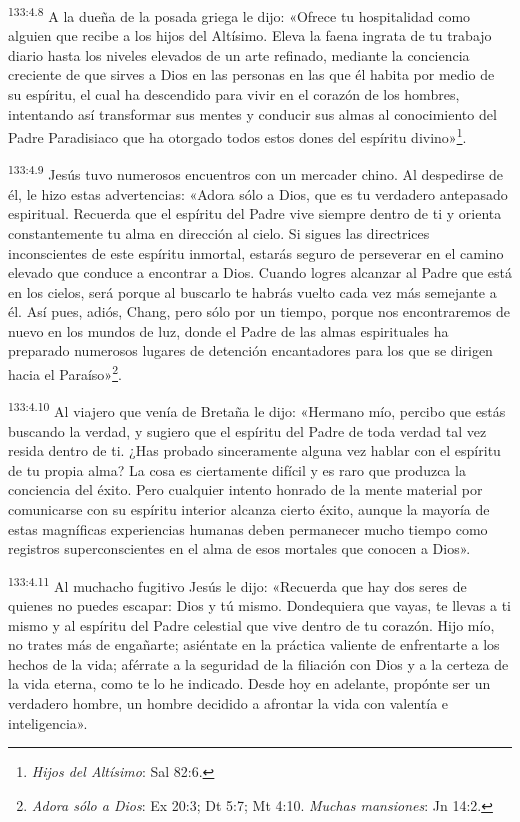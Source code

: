\par
\textsuperscript{133:4.8} A la dueña de la posada griega le dijo: «Ofrece tu hospitalidad como alguien que recibe a los hijos del Altísimo. Eleva la faena ingrata de tu trabajo diario hasta los niveles elevados de un arte refinado, mediante la conciencia creciente de que sirves a Dios en las personas en las que él habita por medio de su espíritu, el cual ha descendido para vivir en el corazón de los hombres, intentando así transformar sus mentes y conducir sus almas al conocimiento del Padre Paradisiaco que ha otorgado todos estos dones del espíritu divino»\footnote{\textit{Hijos del Altísimo}: Sal 82:6.}.

\par
\textsuperscript{133:4.9} Jesús tuvo numerosos encuentros con un mercader chino. Al despedirse de él, le hizo estas advertencias: «Adora sólo a Dios, que es tu verdadero antepasado espiritual. Recuerda que el espíritu del Padre vive siempre dentro de ti y orienta constantemente tu alma en dirección al cielo. Si sigues las directrices inconscientes de este espíritu inmortal, estarás seguro de perseverar en el camino elevado que conduce a encontrar a Dios. Cuando logres alcanzar al Padre que está en los cielos, será porque al buscarlo te habrás vuelto cada vez más semejante a él. Así pues, adiós, Chang, pero sólo por un tiempo, porque nos encontraremos de nuevo en los mundos de luz, donde el Padre de las almas espirituales ha preparado numerosos lugares de detención encantadores para los que se dirigen hacia el Paraíso»\footnote{\textit{Adora sólo a Dios}: Ex 20:3; Dt 5:7; Mt 4:10. \textit{Muchas mansiones}: Jn 14:2.}.

\par
\textsuperscript{133:4.10} Al viajero que venía de Bretaña le dijo: «Hermano mío, percibo que estás buscando la verdad, y sugiero que el espíritu del Padre de toda verdad tal vez resida dentro de ti. ¿Has probado sinceramente alguna vez hablar con el espíritu de tu propia alma? La cosa es ciertamente difícil y es raro que produzca la conciencia del éxito. Pero cualquier intento honrado de la mente material por comunicarse con su espíritu interior alcanza cierto éxito, aunque la mayoría de estas magníficas experiencias humanas deben permanecer mucho tiempo como registros superconscientes en el alma de esos mortales que conocen a Dios».

\par
\textsuperscript{133:4.11} Al muchacho fugitivo Jesús le dijo: «Recuerda que hay dos seres de quienes no puedes escapar: Dios y tú mismo. Dondequiera que vayas, te llevas a ti mismo y al espíritu del Padre celestial que vive dentro de tu corazón. Hijo mío, no trates más de engañarte; asiéntate en la práctica valiente de enfrentarte a los hechos de la vida; aférrate a la seguridad de la filiación con Dios y a la certeza de la vida eterna, como te lo he indicado. Desde hoy en adelante, propónte ser un verdadero hombre, un hombre decidido a afrontar la vida con valentía e inteligencia».


